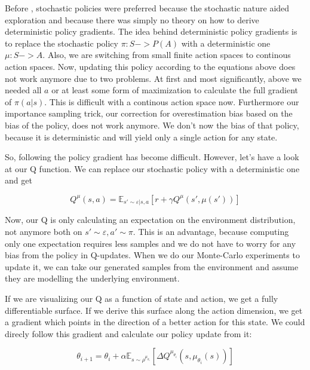 \documentclass[hyperref,german,beleg]{cgvpub}
\begin{document}
Before \cite{silverDeterministicPolicyGradient2013}, stochastic policies were preferred because the stochastic nature aided exploration and because there was simply no theory on how to derive deterministic policy gradients. The idea behind deterministic policy gradients is to replace the stochastic policy $\pi: S -> P(A)$ with a deterministic one $\mu: S -> A$. Also, we are switching from small finite action spaces to continous action spaces. Now, updating this policy according to the equations above does not work anymore due to two problems. At first and most significantly, above we needed all $a$ or at least some form of maximization to calculate the full gradient of $\pi(a|s)$. This is difficult with a continous action space now. Furthermore our importance sampling trick, our correction for overestimation bias based on the bias of the policy, does not work anymore. We don't now the bias of that policy, because it is deterministic and will yield only a single action for any state. 

So, following the policy gradient has become difficult. However, let's have a look at our Q function. We can replace our stochastic policy with a deterministic one and get

\begin{equation}
Q^{\mu}(s,a) = \mathbb{E}_{s' \sim \varepsilon | s,a}[r + \gamma Q^{\mu}(s', \mu(s'))]
\end{equation}

Now, our Q is only calculating an expectation on the environment distribution, not anymore both on $s' \sim \varepsilon, a' \sim \pi$. This is an advantage, because computing only one expectation requires less samples and we do not have to worry for any bias from the policy in Q-updates. When we do our Monte-Carlo experiments to update it, we can take our generated samples from the environment and assume they are modelling the underlying environment.

If we are visualizing our Q as a function of state and action, we get a fully differentiable surface. If we derive this surface along the action dimension, we get a gradient which points in the direction of a better action for this state. We could direcly follow this gradient and calculate our policy update from it:

\begin{equation}
\theta_{i+1} = \theta_i + \alpha \mathbb{E}_{s \sim \rho^{\mu_{\theta_i}}}[\Delta Q^{\mu_{\theta_i}}(s, \mu_{\theta_i}(s))]
\end{equation}
\end{document}
